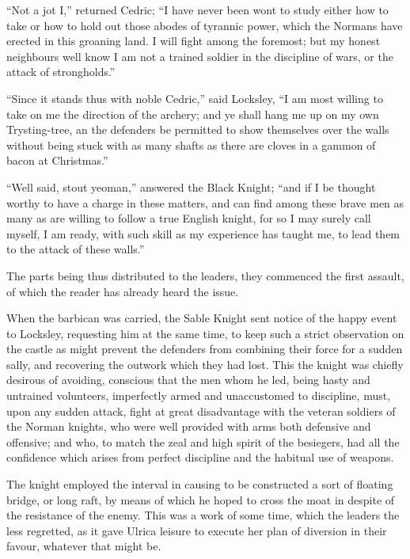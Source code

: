 ``Not a jot I,'' returned Cedric; ``I have never been wont to study
either how to take or how to hold out those abodes of tyrannic power,
which the Normans have erected in this groaning land. I will fight among
the foremost; but my honest neighbours well know I am not a trained
soldier in the discipline of wars, or the attack of strongholds.''

``Since it stands thus with noble Cedric,'' said Locksley, ``I am most
willing to take on me the direction of the archery; and ye shall hang me
up on my own Trysting-tree, an the defenders be permitted to show
themselves over the walls without being stuck with as many shafts as
there are cloves in a gammon of bacon at Christmas.''

``Well said, stout yeoman,'' answered the Black Knight; ``and if I be
thought worthy to have a charge in these matters, and can find among
these brave men as many as are willing to follow a true English knight,
for so I may surely call myself, I am ready, with such skill as my
experience has taught me, to lead them to the attack of these walls.''

The parts being thus distributed to the leaders, they commenced the
first assault, of which the reader has already heard the issue.

When the barbican was carried, the Sable Knight sent notice of the happy
event to Locksley, requesting him at the same time, to keep such a
strict observation on the castle as might prevent the defenders from
combining their force for a sudden sally, and recovering the outwork
which they had lost. This the knight was chiefly desirous of avoiding,
conscious that the men whom he led, being hasty and untrained
volunteers, imperfectly armed and unaccustomed to discipline, must, upon
any sudden attack, fight at great disadvantage with the veteran soldiers
of the Norman knights, who were well provided with arms both defensive
and offensive; and who, to match the zeal and high spirit of the
besiegers, had all the confidence which arises from perfect discipline
and the habitual use of weapons.

The knight employed the interval in causing to be constructed a sort of
floating bridge, or long raft, by means of which he hoped to cross the
moat in despite of the resistance of the enemy. This was a work of some
time, which the leaders the less regretted, as it gave Ulrica leisure to
execute her plan of diversion in their favour, whatever that might be.


